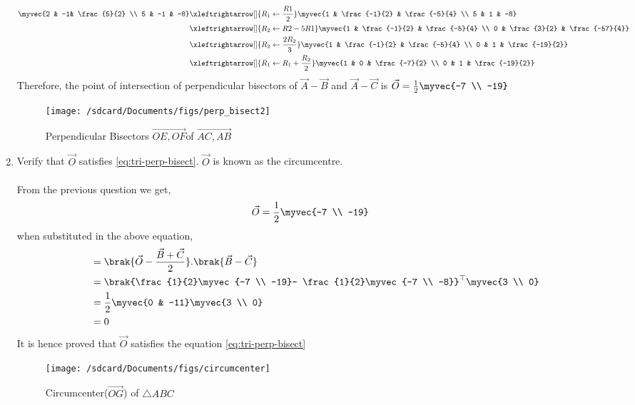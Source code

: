 \documentclass[11pt]{book}
\begin{document}
\begin{enumerate}[label=\thesection.\arabic*.,ref=\thesection.\theenumi]
\begin{align}
\myvec{2 & -1& \frac{5}{2} \\ 5 & -1 & -8} &\xleftrightarrow[]{R_1 \leftarrow \frac{R1}{2}} \myvec{1 & \frac{-1}{2} & \frac{-5}{4} \\ 5 & 1 & -8}\\
&\xleftrightarrow[]{R_2 \leftarrow R2-5R1}
\myvec{1 & \frac{-1}{2} & \frac{-5}{4} \\ 0 & \frac{3}{2} & \frac{-57}{4}}\\ 
&\xleftrightarrow[]{R_2\leftarrow \frac{2R_2}{3}} \myvec{1 & \frac{-1}{2} & \frac{-5}{4} \\ 0 & 1 & \frac{-19}{2}}\\
&\xleftrightarrow[]{R_1\leftarrow R_1 + \frac{R_2}{2}}
 \myvec{1 & 0 & \frac{-7}{2} \\ 0 & 1 & \frac{-19}{2}}
\end{align}
Therefore, the point of intersection of perpendicular bisectors of $\vec{A}-\vec{B}$ and $\vec{A}-\vec{C}$ is $\vec{O} = \frac{1}{2}\myvec{-7 \\ -19}$
		\begin{figure}[H]
\texttt{[image: /sdcard/Documents/figs/perp\_bisect2]}
			\caption{Perpendicular Bisectors $\vec{OE,OF }$of $\vec{AC,AB}$}
\label{fig:Bisectors OE,OF}
\end{figure}

\item Verify that $\vec{O}$ satisfies
			\eqref{eq:tri-perp-bisect}.
$\vec{O}$ is known as the circumcentre.\\
\solution\\
 From the previous question we get,
 \begin{align}
	\vec{O}&=\frac{1}{2} \myvec{-7 \\ -19}
\end{align}
when substituted in the above equation,
\begin{align}
	&= \brak{\vec{O}-\frac{\vec{B}+\vec{C}}{2}}.\brak{\vec{B}-\vec{C}}\\
	&= \brak{\frac{1}{2}\myvec{-7 \\ -19}- \frac{1}{2}\myvec{-7 \\ -8}}^{\top} \myvec{3 \\ 0}\\
	&= \frac{1}{2}\myvec{0 & -11}\myvec{3 \\ 0}\\
	&= 0
\end{align}
It is hence proved that $\vec{O}$ satisfies the equation \eqref{eq:tri-perp-bisect}
\begin{figure}[H]                                         
	\texttt{[image: /sdcard/Documents/figs/circumcenter]}
	\caption{Circumcenter($\vec{OG}$) of $\triangle ABC$}
\label{fig:circumcenter OG}      
\end{figure}


\end{enumerate}
\end{document}

